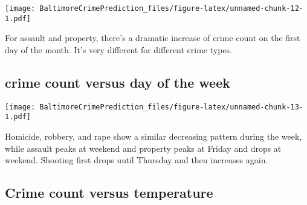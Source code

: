 \documentclass[]{article}
\newenvironment{Shaded}{\begin{snugshade}}{\end{snugshade}}
\newcommand{\KeywordTok}[1]{\textcolor[rgb]{0.13,0.29,0.53}{\textbf{#1}}}
\newcommand{\DataTypeTok}[1]{\textcolor[rgb]{0.13,0.29,0.53}{#1}}
\newcommand{\DecValTok}[1]{\textcolor[rgb]{0.00,0.00,0.81}{#1}}
\newcommand{\StringTok}[1]{\textcolor[rgb]{0.31,0.60,0.02}{#1}}
\newcommand{\OperatorTok}[1]{\textcolor[rgb]{0.81,0.36,0.00}{\textbf{#1}}}
\newcommand{\NormalTok}[1]{#1}
\begin{document}
\texttt{[image: BaltimoreCrimePrediction\_files/figure-latex/unnamed-chunk-12-1.pdf]}

For assault and property, there's a dramatic increase of crime count on
the first day of the month. It's very different for different crime
types.

\subsection{crime count versus day of the
week}\label{crime-count-versus-day-of-the-week}

\begin{Shaded}
\end{Shaded}

\texttt{[image: BaltimoreCrimePrediction\_files/figure-latex/unnamed-chunk-13-1.pdf]}

Homicide, robbery, and rape show a similar decreasing pattern during the
week, while assault peaks at weekend and property peaks at Friday and
drops at weekend. Shooting first drops until Thursday and then increases
again.

\subsection{Crime count versus
temperature}\label{crime-count-versus-temperature}
\end{document}
